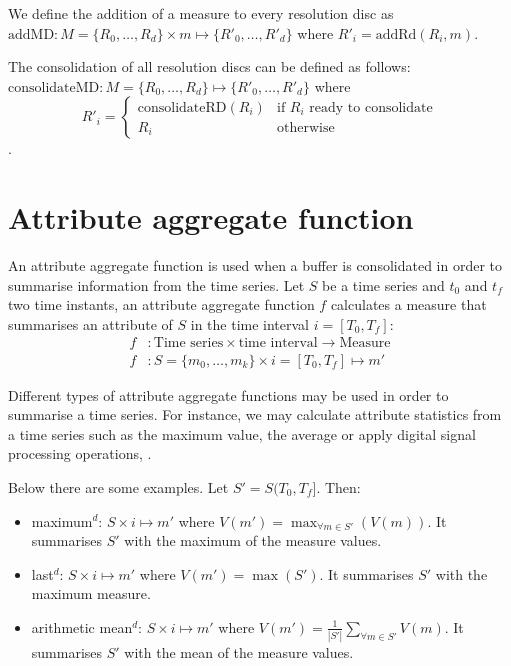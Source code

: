 We define the addition of a measure to every resolution disc as
$\text{addMD} : M=\{R_0, \dots, R_d\} \times m \mapsto \{R'_0, \dots,
R'_d\}$ where $R'_i=\text{addRd}(R_i,m)$.

The consolidation of all resolution discs can be defined as follows:
$\text{consolidateMD}: M=\{R_0, \dots, R_d\} \mapsto \{R'_0, \dots,
R'_d\}$ where
$$ 
R'_i = \begin{cases}
  \text{consolidateRD}(R_i) & \text{if } R_i \text{ ready to consolidate} \\
  R_i                       & \text{otherwise}
\end{cases}
$$.


\section{Attribute aggregate function}
\label{sec:model:interpolador}

An attribute aggregate function is used when a buffer is consolidated
in order to summarise information from the time series.  Let $S$ be a
time series and $t_0$ and $t_f$ two time instants, an attribute
aggregate function $f$ calculates a measure that summarises an
attribute of $S$ in the time interval $i=[T_0,T_f]$:
\begin{align*}
f&: \text{Time series} \times \text{time interval} \longrightarrow
\text{Measure} \\
f&: S=\{m_0,\ldots,m_k\} \times i=[T_0,T_f] \mapsto m'
\end{align*}

Different types of attribute aggregate functions may be used in order
to summarise a time series. For instance, we may calculate attribute
statistics from a time series such as the maximum value, the average
or apply digital signal processing operations, \cite{zhang11}.

Below there are some examples. Let $S'=S(T_0,T_f]$. Then:
\begin{itemize}
\renewcommand{\labelitemi}{--}
\item maximum$^d$: $S \times i \mapsto m'$ where $V(m') =
  \max_{\forall m \in S'}(V(m))$. It summarises $S'$ with the maximum
  of the measure values.
\item last$^d$: $S \times i \mapsto m'$ where $V(m') = \max(S')$. It
  summarises $S'$ with the maximum measure.
\item arithmetic mean$^d$: $S \times i \mapsto m'$ where $V(m') =
  \frac{1}{|S'|} \sum\limits_{\forall m\in S'} V(m)$. It
  summarises $S'$ with the mean of the measure values.
\end{itemize}

